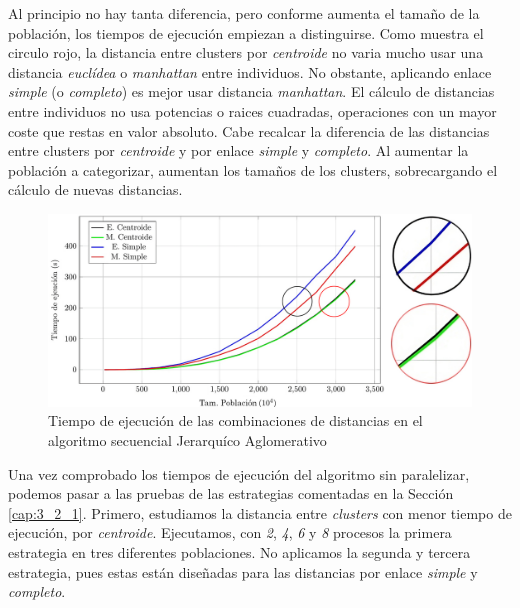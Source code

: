 		Al principio no hay tanta diferencia, pero conforme aumenta el tamaño de la población, los tiempos de ejecución empiezan a distinguirse. Como muestra el circulo rojo, la distancia entre clusters por \textit{centroide} no varia mucho usar una distancia \textit{euclídea} o \textit{manhattan} entre individuos. No obstante, aplicando enlace \textit{simple} (o \textit{completo}) es mejor usar distancia \textit{manhattan}. El cálculo de distancias entre individuos no usa potencias o raices cuadradas, operaciones con un mayor coste que restas en valor absoluto. Cabe recalcar la diferencia de las distancias entre clusters por \textit{centroide} y por enlace \textit{simple} y \textit{completo}. Al aumentar la población a categorizar, aumentan los tamaños de los clusters, sobrecargando el cálculo de nuevas distancias.
		
		
		\begin{figure}[!h]
			\centering
			\includegraphics[width=\textwidth]{images/chapter_4/jerarquico}
			\caption{Tiempo de ejecución de las combinaciones de distancias en el algoritmo secuencial Jerarquíco Aglomerativo}
			\label{fig:prueba_jerarquicosec}
		\end{figure}
	
			
			
		
		
		Una vez comprobado los tiempos de ejecución del algoritmo sin paralelizar, podemos pasar a las pruebas de las estrategias comentadas en la Sección \ref{cap:3_2_1}. Primero, estudiamos la distancia entre \textit{clusters} con menor tiempo de ejecución, por \textit{centroide}. Ejecutamos, con \textit{2}, \textit{4}, \textit{6} y \textit{8} procesos la primera estrategia en tres diferentes poblaciones. No aplicamos la segunda y tercera estrategia, pues estas están diseñadas para las distancias por enlace \textit{simple} y \textit{completo}.
		
